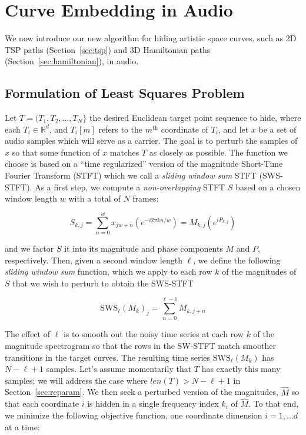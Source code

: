 \documentclass[runningheads]{llncs}
\begin{document}
\section{Curve Embedding in Audio}

We now introduce our new algorithm for hiding artistic space curves, such as 2D TSP paths (Section~\ref{sec:tsp}) and 3D Hamiltonian paths (Section~\ref{sec:hamiltonian}), in audio.

\subsection{Formulation of Least Squares Problem}

Let $T = (T_1, T_2, \hdots, T_N \}$ the desired Euclidean target point sequence to hide, where each $T_i \in \mathbb{R}^d$, and $T_i[m]$ refers to the $m^{\text{th}}$ coordinate of $T_i$, and let $x$ be a set of audio samples which will serve as a carrier.  The goal is to perturb the samples of $x$ so that some function of $x$ matches $T$ as closely as possible.  The function we choose is based on a ``time regularized'' version of the magnitude Short-Time Fourier Transform (STFT) which we call a {\em sliding window sum} STFT (SWS-STFT).  As a first step, we compute a {\em non-overlapping} STFT $S$ based on a chosen window length $w$ with a total of $N$ frames:

\begin{equation}
  S_{k, j} = \sum_{n = 0}^w x_{jw + n} \left(e^{-i 2 \pi k n / w} \right) = M_{k, j} \left( e^{i P_{k, j}} \right)
\end{equation}

and we factor $S$ it into its magnitude and phase components $M$ and $P$, respectively.  Then, given a second window length $\ell$, we define the following {\em sliding window sum} function, which we apply to each row $k$ of the magnitudes of $S$ that we wish to perturb to obtain the SWS-STFT

\begin{equation}
  \text{SWS}_{\ell}\left({M_k}\right)_j = \sum_{n = 0}^{\ell-1} M_{k, j+n}
\end{equation}

The effect of $\ell$ is to smooth out the noisy time series at each row $k$ of the magnitude spectrogram so that the rows in the SW-STFT match smoother transitions in the target curves.  The resulting time series $\text{SWS}_{\ell}\left({M_k}\right)$ has $N-\ell+1$ samples.  Let's assume momentarily that $T$ has exactly this many samples; we will address the case where $len(T) > N-\ell+1$ in Section~\ref{sec:reparam}.  We then seek a perturbed version of the magnitudes, $\hat{M}$ so that each coordinate $i$ is hidden in a single frequency index $k_i$ of $\hat{M}$.  To that end, we minimize the following objective function, one coordinate dimension $i = 1, ... d$ at a time:
\end{document}

